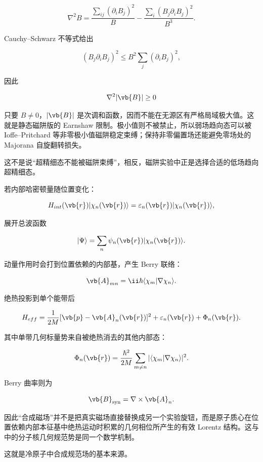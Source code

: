 \[
\nabla^2B
=\frac{\sum_{ij}(\partial_iB_j)^2}{B}
-\frac{\sum_i(B_j\partial_iB_j)^2}{B^3}.
\]

Cauchy--Schwarz 不等式给出

\[
(B_j\partial_iB_j)^2
\le B^2\sum_j(\partial_iB_j)^2,
\]

因此

\begin{equation}
\nabla^2|\vb{B}|\ge0
\label{eq:magnetic-field-subharmonic}
\end{equation}

只要 \(B\neq0\)，\(|\vb{B}|\) 是次调和函数，因而不能在无源区有严格局域极大值。这就是静态磁阱版的 Earnshaw 限制。极小值则不被禁止，所以弱场趋向态可以被 Ioffe--Pritchard 等非零极小值磁阱稳定束缚；保持非零偏置场还能避免零场处的 Majorana 自旋翻转损失。

这不是说``超精细态不能被磁阱束缚''，相反，磁阱实验中正是选择合适的低场趋向超精细态。

若内部哈密顿量随位置变化：

\[
H_{int}(\vb{r})|\chi_n(\vb{r})\rangle
=\varepsilon_n(\vb{r})|\chi_n(\vb{r})\rangle,
\]

展开总波函数

\[
|\Psi\rangle
=\sum_n\psi_n(\vb{r})|\chi_n(\vb{r})\rangle.
\]

动量作用时会打到位置依赖的内部基，产生 Berry 联络：

\[
\vb{A}_{mn}
=\ii\hbar\langle\chi_m|\nabla\chi_n\rangle
.
\]

绝热投影到单个能带后

\[
H_{eff}
=\frac1{2M}[\vb{p}-\vb{A}_n(\vb{r})]^2
+\varepsilon_n(\vb{r})+\Phi_n(\vb{r}).
\]

其中单带几何标量势来自被绝热消去的其他内部态：

\[
\Phi_n(\vb{r})
=\frac{\hbar^2}{2M}
\sum_{m\neq n}
|\langle\chi_m|\nabla\chi_n\rangle|^2.
\]

Berry 曲率则为

\[
\vb{B}_{\rm syn}=\nabla\times\vb{A}_n.
\]

因此“合成磁场”并不是把真实磁场直接替换成另一个实验旋钮，而是原子质心在位置依赖内部本征基中绝热运动时积累的几何相位所产生的有效 Lorentz 结构。这与中的分子核几何规范势是同一个数学机制。

这就是冷原子中合成规范场的基本来源。

